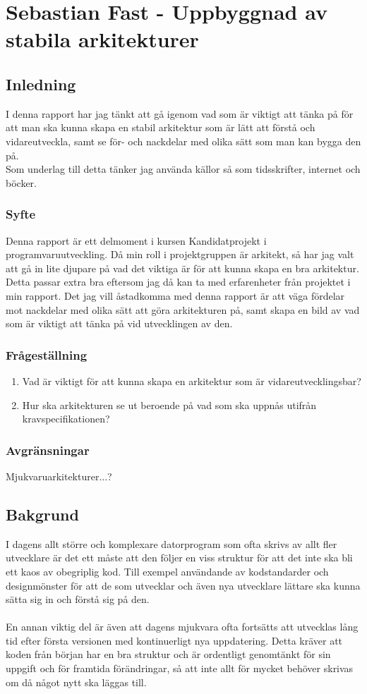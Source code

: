 \section{Sebastian Fast - Uppbyggnad av stabila arkitekturer}
\subsection{Inledning}
I denna rapport har jag tänkt att gå igenom vad som är viktigt att tänka på för att man ska kunna skapa en stabil arkitektur som är lätt att förstå och vidareutveckla, samt se för- och nackdelar med olika sätt som man kan bygga den på.
\\
Som underlag till detta tänker jag använda källor så som tidsskrifter, internet och böcker.   
\subsubsection{Syfte}
Denna rapport är ett delmoment i kursen Kandidatprojekt i programvaruutveckling. Då min roll i projektgruppen är arkitekt, så har jag valt att gå in lite djupare på vad det viktiga är för att kunna skapa en bra arkitektur. Detta passar extra bra eftersom jag då kan ta med erfarenheter från projektet i min rapport.
Det jag vill åstadkomma med denna rapport är att väga fördelar mot nackdelar med olika sätt att göra arkitekturen på, samt skapa en bild av vad som är viktigt att tänka på vid utvecklingen av den.
\subsubsection{Frågeställning}
\begin{enumerate}
	\item Vad är viktigt för att kunna skapa en arkitektur som är vidareutvecklingsbar?
	\item Hur ska arkitekturen se ut beroende på vad som ska uppnås utifrån kravspecifikationen?
\end{enumerate}
\subsubsection{Avgränsningar}
Mjukvaruarkitekturer...?
\subsection{Bakgrund}
I dagens allt större och komplexare datorprogram som ofta skrivs av allt fler utvecklare är det ett måste att den följer en viss struktur för att det inte ska bli ett kaos av obegriplig kod. Till exempel användande av kodstandarder och designmönster för att de som utvecklar och även nya utvecklare lättare ska kunna sätta sig in och förstå sig på den.
\\\\
En annan viktig del är även att dagens mjukvara ofta fortsätts att utvecklas lång tid efter första versionen med kontinuerligt nya uppdatering. Detta kräver att koden från början har en bra struktur och är ordentligt genomtänkt för sin uppgift och för framtida förändringar, så att inte allt för mycket behöver skrivas om då något nytt ska läggas till.
